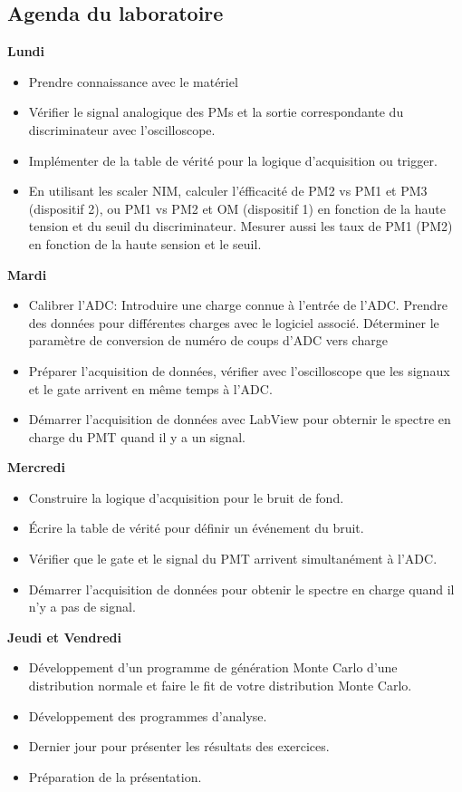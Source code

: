 \subsection{Agenda du laboratoire}
\textbf{Lundi}
\begin{itemize}
\item Prendre connaissance avec le matériel
\item Vérifier le signal analogique des PMs et la sortie correspondante du discriminateur avec l'oscilloscope.
\item Implémenter de la table de vérité pour la logique d'acquisition ou trigger.
\item En utilisant les scaler NIM, calculer l’éfficacité de PM2 vs PM1 et PM3 (dispositif 2), ou PM1 vs PM2 et OM (dispositif 1) en fonction de la haute tension et du seuil du discriminateur. Mesurer aussi les taux de PM1 (PM2) en fonction de la haute sension et le seuil.
\end{itemize}
\vspace{\baselineskip}
\textbf{Mardi}
\begin{itemize}
\item Calibrer l'ADC: Introduire une charge connue à l'entrée de l’ADC. Prendre des données pour différentes charges avec le logiciel associé. Déterminer le paramètre de conversion de numéro de coups d’ADC vers charge
\item Préparer l'acquisition de données, vérifier avec l'oscilloscope que les signaux et le gate arrivent en même temps à l'ADC.
\item Démarrer l'acquisition de données avec LabView pour obternir le spectre en charge du PMT quand il y a un signal.
\end{itemize}
\vspace{\baselineskip}
\textbf{Mercredi}
\begin{itemize}
\item Construire la logique d'acquisition pour le bruit de fond.
\item Écrire la table de vérité pour définir un événement du bruit.
\item Vérifier que le gate et le signal du PMT arrivent simultanément à l'ADC.
\item Démarrer l'acquisition de données pour obtenir le spectre en charge quand il n'y a pas de signal.
\end{itemize}
\vspace{\baselineskip}
\textbf{Jeudi et Vendredi}
\begin{itemize}
\item Développement d'un programme de génération Monte Carlo d'une distribution normale et faire le fit de votre distribution Monte Carlo.
\item Développement des programmes d'analyse.
\item Dernier jour pour présenter les résultats des exercices.
\item Préparation de la présentation.
\end{itemize}
